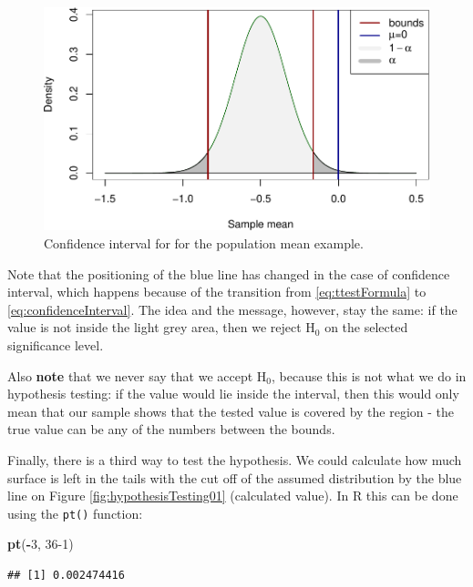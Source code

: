 \documentclass[
]{book}
\newenvironment{Shaded}{\begin{snugshade}}{\end{snugshade}}
\newcommand{\DecValTok}[1]{\textcolor[rgb]{0.00,0.00,0.81}{#1}}
\newcommand{\FunctionTok}[1]{\textcolor[rgb]{0.13,0.29,0.53}{\textbf{#1}}}
\newcommand{\NormalTok}[1]{#1}
\newcommand{\SpecialCharTok}[1]{\textcolor[rgb]{0.81,0.36,0.00}{\textbf{#1}}}
\theoremstyle{definition}
\theoremstyle{definition}
\theoremstyle{definition}
\theoremstyle{definition}
\theoremstyle{remark}
\begin{document}
\begin{figure}
\centering
\includegraphics{Svetunkov---Statistics-for-Business-Analytics_files/figure-latex/hypothesisTesting02-1.pdf}
\caption{\label{fig:hypothesisTesting02}Confidence interval for for the population mean example.}
\end{figure}

Note that the positioning of the blue line has changed in the case of confidence interval, which happens because of the transition from \eqref{eq:ttestFormula} to \eqref{eq:confidenceInterval}. The idea and the message, however, stay the same: if the value is not inside the light grey area, then we reject \(\mathrm{H}_0\) on the selected significance level.

Also \textbf{note} that we never say that we accept \(\mathrm{H}_0\), because this is not what we do in hypothesis testing: if the value would lie inside the interval, then this would only mean that our sample shows that the tested value is covered by the region - the true value can be any of the numbers between the bounds.

Finally, there is a third way to test the hypothesis. We could calculate how much surface is left in the tails with the cut off of the assumed distribution by the blue line on Figure \ref{fig:hypothesisTesting01} (calculated value). In R this can be done using the \texttt{pt()} function:

\begin{Shaded}
\begin{Highlighting}[]
\FunctionTok{pt}\NormalTok{(}\SpecialCharTok{{-}}\DecValTok{3}\NormalTok{, }\DecValTok{36{-}1}\NormalTok{)}
\end{Highlighting}
\end{Shaded}

\begin{verbatim}
## [1] 0.002474416
\end{verbatim}
\end{document}
